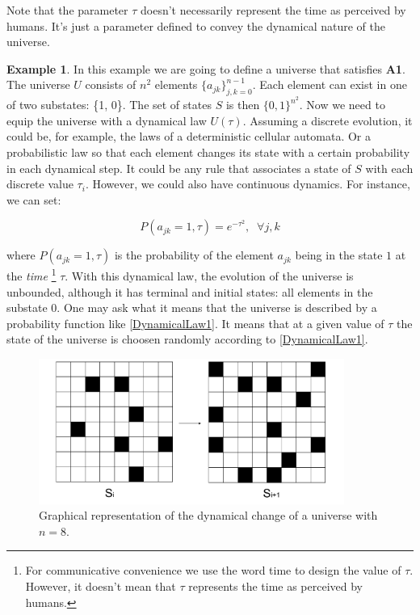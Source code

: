 \documentclass[11pt,a4paper,twoside]{report}
\newcommand{\+}{\textnormal{+} }
\theoremstyle{definition}
\newtheorem{myex}[mythm]{Example}
\numberwithin{equation}{chapter}
\begin{document}
Note that the parameter $\tau$ doesn't necessarily represent the time as 
perceived by humans. It's just a parameter defined to convey the dynamical 
nature of the universe.

\begin{myex}
  \label{example1}
In this example we are going to define a universe that satisfies \textbf{A1}.
The universe $U$ consists of $n^2$ elements $\{a_{jk}\}_{j,k=0}^{n-1}$. Each 
element can exist in one of two substates: \{1, 0\}. The set of states $S$ is 
then $\{0,1\}^{n^2}.$
Now we need to equip
the universe with a dynamical law $U(\tau)$. Assuming a discrete evolution, 
it could be, for example, the laws of a deterministic cellular automata. Or 
a probabilistic law so that each element changes its state with a 
certain probability in each dynamical step. It could be any rule that associates
a state of $S$ with each discrete value $\tau_i$. However, we could also have 
continuous dynamics. For instance, we can set:

\begin{equation}
  P(a_{jk}=1,\tau)=e^{-\tau^2} ,\;\;\forall j,k 
  \label{DynamicalLaw1}
\end{equation}

where $P(a_{jk}=1, \tau)$ is the probability of the element $a_{jk}$ being in 
the state $1$ at the \textit{time} \footnote{For communicative convenience 
we use the word time to design the value of $\tau$. However, it doesn't mean
that $\tau$ represents the time as perceived by humans.} $\tau$. With this 
dynamical law, the evolution of the universe is unbounded, although it has 
terminal and initial states: all elements in the substate 0. One may ask what it 
means that the universe is described by a probability function like 
\eqref{DynamicalLaw1}. It means that at a given value of $\tau$ the state of 
the universe is choosen randomly according to \eqref{DynamicalLaw1}.
\begin{figure}[t]
  \centering
  \includegraphics[width=100mm,scale=0.5]{figures/UniverseA1.pdf}
   \caption{Graphical representation of the dynamical change of a universe
   with $n=8$.}
\end{figure} 
\end{myex}
\end{document}
